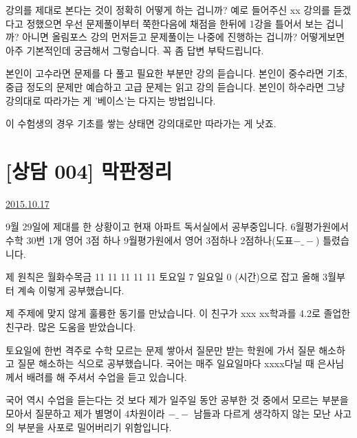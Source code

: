     \vspace{5mm}
    강의를 제대로 본다는 것이 정확히 어떻게 하는 겁니까?
    예로 들어주신 xx 강의를 듣겠다고 정했으면
    우선 문제풀이부터 쭉한다음에 채점을 한뒤에 1강을 틀어서 보는 겁니까? 아니면
    올림포스 강의 먼저듣고 문제풀이는 나중에 진행하는 겁니까?
    어떻게보면 아주 기본적인데 궁금해서 그렇습니다.
    꼭 좀 답변 부탁드립니다.
    \vspace{5mm}

본인이 고수라면 문제를 다 풀고 필요한 부분만 강의 듣습니다.
본인이 중수라면 기초, 중급 정도의 문제만 예습하고 고급 문제는 읽고 강의 듣습니다.
본인이 하수라면 그냥 강의대로 따라가는 게 '베이스'는 다지는 방법입니다.
\vspace{5mm}

이 수험생의 경우 기초를 쌓는 상태면 강의대로만 따라가는 게 낫죠.



\section{[상담 004] 막판정리}
\href{https://www.kockoc.com/Apoc/422874}{2015.10.17}

    \vspace{5mm}

    9월 29일에 제대를 한 상황이고 현재 아파트 독서실에서 공부중입니다.
    6월평가원에서 수학 30번 1개 영어 3점 하나
    9월평가원에서 영어 3점하나 2점하나(도표$-\_-$) 틀렸습니다.
    \vspace{5mm}

    제 원칙은 월화수목금 11 11 11 11 11 토요일 7 일요일 0 (시간)으로 잡고
    올해 3월부터 계속 이렇게 공부했습니다.
    \vspace{5mm}

    제 주제에 맞지 않게 훌륭한 동기를 만났습니다.
    이 친구가 xxx xx학과를 4.2로 졸업한 친구라. 많은 도움을 받았습니다.
    \vspace{5mm}

    토요일에 한번 격주로 수학 모르는 문제 쌓아서 질문만 받는 학원에 가서 질문 해소하고 질문 해소하는 식으로 공부했습니다.
    국어는 매주 일요일마다 xxxx다닐 때 은사님께서 배려를 해 주셔서 수업을 듣고 있습니다.
    \vspace{5mm}

    국어 역시 수업을 듣는다는 것 보다 제가 일주일 동안 공부한 것 중에서 모르는 부분을 모아서 질문하고
    제가 별명이 4차원이라 $-\_-$ 남들과 다르게 생각하지 않는 모난 사고의 부분을 사포로 밀어버리기 위함입니다.
    \vspace{5mm}


